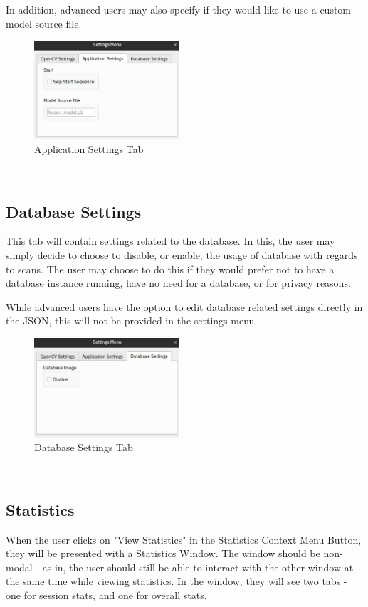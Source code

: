 \documentclass[conference]{IEEEtran}
\begin{document}
In addition, advanced users may also specify if they would like to use a custom model source file.~\\

\begin{figure}[h]
    \centering
    \includegraphics[width=0.48\textwidth]{images/settings_2.eps}
    \caption{Application Settings Tab}
\end{figure}~\\

\subsection{Database Settings}
This tab will contain settings related to the database. In this, the user may simply decide to choose to disable, or enable, the usage of database with regards to scans. The user may choose to do this if they would prefer not to have a database instance running, have no need for a database, or for privacy reasons.

While advanced users have the option to edit database related settings directly in the JSON, this will not be provided in the settings menu.~\\

\begin{figure}[h]
    \centering
    \includegraphics[width=0.48\textwidth]{images/settings_3.eps}
    \caption{Database Settings Tab}
\end{figure}~\\

\subsection{Statistics}
When the user clicks on "View Statistics" in the Statistics Context Menu Button, they will be presented with a Statistics Window. The window should be non-modal - as in, the user should still be able to interact with the other window at the same time while viewing statistics. In the window, they will see two tabs - one for session stats, and one for overall stats.~\\
\end{document}
